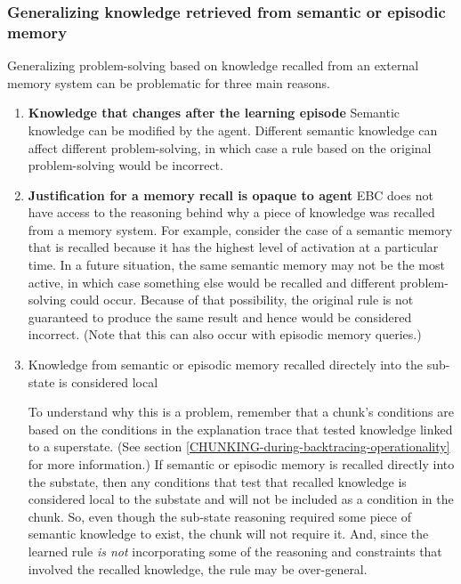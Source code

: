 \subsubsection{Generalizing knowledge retrieved from semantic or episodic memory}

Generalizing problem-solving based on knowledge recalled from an external memory system can be problematic for three main reasons.

\begin{enumerate}
	\item \textbf{Knowledge that changes after the learning episode} \newline
	Semantic knowledge can be modified by the agent.  Different semantic knowledge can affect different problem-solving, in which case a rule based on the original problem-solving would be incorrect. 

	\item \textbf{Justification for a memory recall is opaque to agent} \newline
	EBC does not have access to the reasoning behind why a piece of knowledge was recalled from a memory system.  For example, consider the case of a semantic memory that is recalled because it has the highest level of activation at a particular time.  In a future situation, the same semantic memory may not be the most active, in which case something else would be recalled and different problem-solving could occur.  Because of that possibility, the original rule is not guaranteed to produce the same result and hence would be considered incorrect.  (Note that this can also occur with episodic memory queries.)

	\item Knowledge from semantic or episodic memory recalled directely into the sub-state is considered local
	
	To understand why this is a problem, remember that a chunk's conditions are based on the conditions in the explanation trace that tested knowledge linked to a superstate.  (See section \ref{CHUNKING-during-backtracing-operationality} for more information.) If semantic or episodic memory is recalled directly into the substate, then any conditions that test that recalled knowledge is considered local to the substate and will not be included as a condition in the chunk.  So, even though the sub-state reasoning required some piece of semantic knowledge to exist, the chunk will not require it.  And, since the learned rule \textit{is not} incorporating some of the reasoning and constraints that involved the recalled knowledge, the rule may be over-general.


\end{enumerate}
